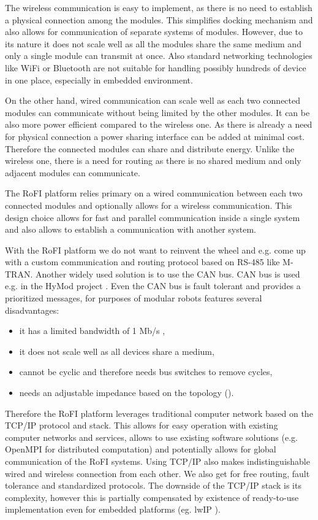 The wireless communication is easy to implement, as there is no need to
establish a physical connection among the modules. This simplifies docking
mechanism and also allows for communication of separate systems of modules.
However, due to its nature it does not scale well as all the modules share the
same medium and only a single module can transmit at once. Also standard
networking technologies like WiFi or Bluetooth are not suitable for handling
possibly hundreds of device in one place, especially in embedded environment.

On the other hand, wired communication can scale well as each two connected
modules can communicate without being limited by the other modules. It can be
also more power efficient compared to the wireless one. As there is already a
need for physical connection a power sharing interface can be added at minimal
cost. Therefore the connected modules can share and distribute energy. Unlike
the wireless one, there is a need for routing as there is no shared medium and
only adjacent modules can communicate.

The RoFI platform relies primary on a wired communication between each two
connected modules and optionally allows for a wireless communication. This
design choice allows for fast and parallel communication inside a single system
and also allows to establish a communication with another system.

With the RoFI platform we do not want to reinvent the wheel and e.g. come up
with a custom communication and routing protocol based on RS-485 like M-TRAN.
Another widely used solution is to use the CAN bus. CAN bus is used e.g. in the
HyMod project \cite{parrott_hymod:_2016}. Even the CAN bus is fault tolerant and
provides a prioritized messages, for purposes of modular robots features several
disadvantages:
\begin{itemize}
    \item it has a limited bandwidth of 1 Mb/s \cite{noauthor_road_2013},
    \item it does not scale well as all devices share a medium,
    \item cannot be cyclic and therefore needs bus switches to remove cycles,
    \item needs an adjustable impedance based on the topology
    (\cite{parrott_hymod:_2016}).
\end{itemize}

Therefore the RoFI platform leverages traditional computer network based on the
TCP/IP protocol and stack. This allows for easy operation with existing computer
networks and services, allows to use existing software solutions (e.g. OpenMPI
for distributed computation) and potentially allows for global communication of
the RoFI systems. Using TCP/IP also makes indistinguishable wired and wireless
connection from each other. We also get for free routing, fault tolerance and
standardized protocols. The downside of the TCP/IP stack is its complexity,
however this is partially compensated by existence of ready-to-use
implementation even for embedded platforms (eg. lwIP ).

